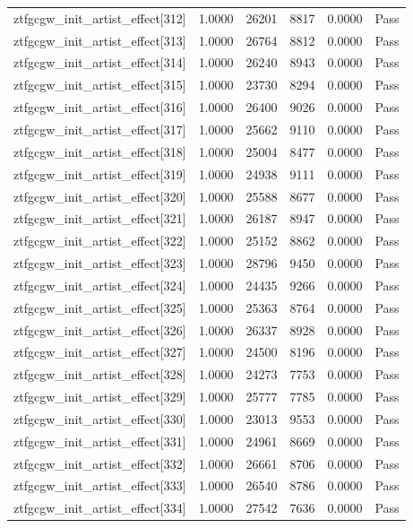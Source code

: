 \begin{table}[htbp]
\begin{tabular}{llrrll}
ztfgcgw\_init\_artist\_effect[312] & 1.0000 & 26201 & 8817 & 0.0000 & Pass \\
ztfgcgw\_init\_artist\_effect[313] & 1.0000 & 26764 & 8812 & 0.0000 & Pass \\
ztfgcgw\_init\_artist\_effect[314] & 1.0000 & 26240 & 8943 & 0.0000 & Pass \\
ztfgcgw\_init\_artist\_effect[315] & 1.0000 & 23730 & 8294 & 0.0000 & Pass \\
ztfgcgw\_init\_artist\_effect[316] & 1.0000 & 26400 & 9026 & 0.0000 & Pass \\
ztfgcgw\_init\_artist\_effect[317] & 1.0000 & 25662 & 9110 & 0.0000 & Pass \\
ztfgcgw\_init\_artist\_effect[318] & 1.0000 & 25004 & 8477 & 0.0000 & Pass \\
ztfgcgw\_init\_artist\_effect[319] & 1.0000 & 24938 & 9111 & 0.0000 & Pass \\
ztfgcgw\_init\_artist\_effect[320] & 1.0000 & 25588 & 8677 & 0.0000 & Pass \\
ztfgcgw\_init\_artist\_effect[321] & 1.0000 & 26187 & 8947 & 0.0000 & Pass \\
ztfgcgw\_init\_artist\_effect[322] & 1.0000 & 25152 & 8862 & 0.0000 & Pass \\
ztfgcgw\_init\_artist\_effect[323] & 1.0000 & 28796 & 9450 & 0.0000 & Pass \\
ztfgcgw\_init\_artist\_effect[324] & 1.0000 & 24435 & 9266 & 0.0000 & Pass \\
ztfgcgw\_init\_artist\_effect[325] & 1.0000 & 25363 & 8764 & 0.0000 & Pass \\
ztfgcgw\_init\_artist\_effect[326] & 1.0000 & 26337 & 8928 & 0.0000 & Pass \\
ztfgcgw\_init\_artist\_effect[327] & 1.0000 & 24500 & 8196 & 0.0000 & Pass \\
ztfgcgw\_init\_artist\_effect[328] & 1.0000 & 24273 & 7753 & 0.0000 & Pass \\
ztfgcgw\_init\_artist\_effect[329] & 1.0000 & 25777 & 7785 & 0.0000 & Pass \\
ztfgcgw\_init\_artist\_effect[330] & 1.0000 & 23013 & 9553 & 0.0000 & Pass \\
ztfgcgw\_init\_artist\_effect[331] & 1.0000 & 24961 & 8669 & 0.0000 & Pass \\
ztfgcgw\_init\_artist\_effect[332] & 1.0000 & 26661 & 8706 & 0.0000 & Pass \\
ztfgcgw\_init\_artist\_effect[333] & 1.0000 & 26540 & 8786 & 0.0000 & Pass \\
ztfgcgw\_init\_artist\_effect[334] & 1.0000 & 27542 & 7636 & 0.0000 & Pass \\

\end{tabular}
\end{table}
